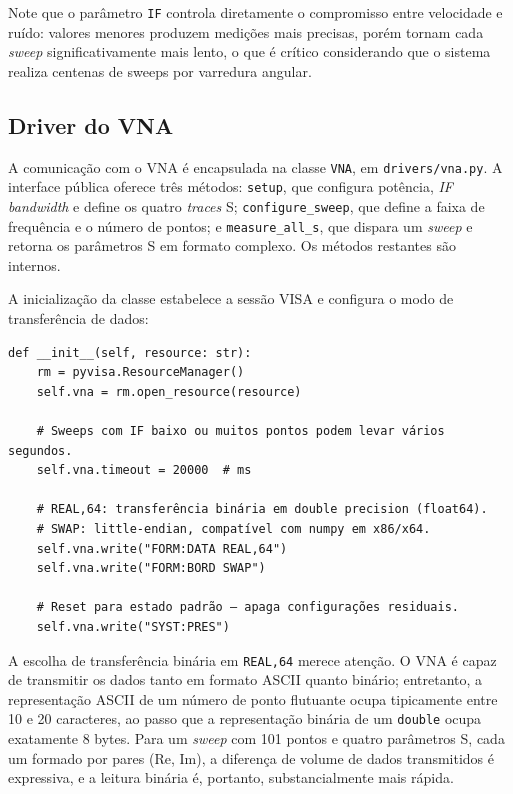 \documentclass[12pt, a4paper]{article}
\begin{document}
Note que o parâmetro \texttt{IF} controla diretamente o compromisso entre velocidade e ruído: valores menores produzem medições mais precisas, porém tornam cada \textit{sweep} significativamente mais lento, o que é crítico considerando que o sistema realiza centenas de sweeps por varredura angular.

\subsection{Driver do VNA}

A comunicação com o VNA é encapsulada na classe \texttt{VNA}, em \texttt{drivers/vna.py}. A interface pública oferece três métodos: \texttt{setup}, que configura potência, \textit{IF bandwidth} e define os quatro \textit{traces} S; \texttt{configure\_sweep}, que define a faixa de frequência e o número de pontos; e \texttt{measure\_all\_s}, que dispara um \textit{sweep} e retorna os parâmetros S em formato complexo. Os métodos restantes são internos.

A inicialização da classe estabelece a sessão VISA e configura o modo de transferência de dados:

\begin{lstlisting}[style=python, caption={Inicialização da sessão VISA e configuração do modo de transferência (\texttt{drivers/vna.py}).}]
def __init__(self, resource: str):
    rm = pyvisa.ResourceManager()
    self.vna = rm.open_resource(resource)

    # Sweeps com IF baixo ou muitos pontos podem levar vários segundos.
    self.vna.timeout = 20000  # ms

    # REAL,64: transferência binária em double precision (float64).
    # SWAP: little-endian, compatível com numpy em x86/x64.
    self.vna.write("FORM:DATA REAL,64")
    self.vna.write("FORM:BORD SWAP")

    # Reset para estado padrão — apaga configurações residuais.
    self.vna.write("SYST:PRES")
\end{lstlisting}

A escolha de transferência binária em \texttt{REAL,64} merece atenção. O VNA é capaz de transmitir os dados tanto em formato ASCII quanto binário; entretanto, a representação ASCII de um número de ponto flutuante ocupa tipicamente entre 10 e 20 caracteres, ao passo que a representação binária de um \texttt{double} ocupa exatamente 8 bytes. Para um \textit{sweep} com 101 pontos e quatro parâmetros S, cada um formado por pares (Re, Im), a diferença de volume de dados transmitidos é expressiva, e a leitura binária é, portanto, substancialmente mais rápida.
\end{document}
